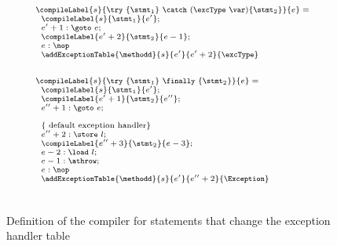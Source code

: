 \begin{figure}[ht!]
\begin{frameit}
$${\scriptsize 
        \begin{array}{l}

	\compileLabel{s}{ \try \ \{ \stmt_1 \} \ \catch \ (\excType \ \var )\{ \stmt_2 \} }{e} = \\
	\begin{array}{l}
             
                       \compileLabel{s}{\stmt_1}{e'}; \\
                       e' + 1: \goto \ e; \\
		  
                       \compileLabel{e' + 2 }{\stmt_2}{e - 1};\\
		       
		        e: \nop
		       \\ 
                    
			\addExceptionTable{\methodd}{ s }{ e'  }{ e' + 2 }{\excType} 
             \end{array} \\ 
	\\ \\  
 	
	\compileLabel{s}{ \try \ \{ \stmt_1 \} \ \finally \ \{ \stmt_2 \} }{e} = \\
       	\begin{array}{l} 
	\compileLabel{s}{\stmt_1}{e'}; \\
	\compileLabel{e'+1}{\stmt_2}{e''}; \\
        e''+1  : \goto \ e ;\\
        
        \\ 
        \{ \mbox{ \rm default exception handler} \} \\
        e'' +  2: \store \ l; \\
	\compileLabel{e'' + 3}{\stmt_2}{e - 3}; \\	                
        e - 2 :\load \ l;\\
        e - 1: \athrow;\\
	e: \nop
        \\
	\addExceptionTable{\methodd}{ s }{  e' }{ e''+2  }{ \Exception } 
        \end{array} \\ 
	\\ \\  
	
		

\end{array} 
} $$

\caption{\sc Definition of the compiler for statements that change the exception handler table}
\label{pogEq:compile:compExpr:defExc}
\end{frameit}
\end{figure}

